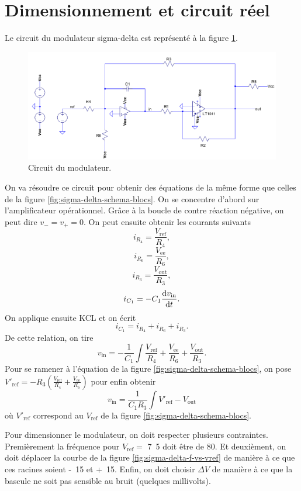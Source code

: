 \section{Dimensionnement et circuit réel}
Le circuit du modulateur sigma-delta est représenté
à la figure \ref{fig:sigma-delta-circuit}.

\begin{figure}[ht]
	\centering
	\includegraphics[scale=0.7]{img/sigma-delta-circuit.png}
	\caption{Circuit du modulateur.}
	\label{fig:sigma-delta-circuit}
\end{figure}

On va résoudre ce circuit pour obtenir des équations
de la même forme que celles de la figure
\ref{fig:sigma-delta-schema-blocs}.
On se concentre d'abord sur l'amplificateur
opérationnel. Grâce à la boucle de contre
réaction négative, on peut dire $v_- = v_+ = 0$.
On peut ensuite obtenir les courants suivants
\[ i_{R_4} = \frac{V_{\text{ref}}}{R_4},\]
\[ i_{R_6} = \frac{V_{\text{ee}}}{R_6},\]
\[ i_{R_3} = \frac{V_{\text{out}}}{R_3},\]
\[ i_{C_1} = -C_1\frac{\operatorname{d}\! v_{\text{in}}}{\operatorname{d}\! t}.\]
On applique ensuite KCL et on écrit
\[ i_{C_1} = i_{R_4} + i_{R_6} + i_{R_3}.\]
De cette relation, on tire
\[ v_{\text{in}} = -\frac{1}{C_1}\int \frac{V_{\text{ref}}}{R_4}
+ \frac{V_{\text{ee}}}{R_6} + \frac{V_{\text{out}}}{R_3}.\]
Pour se ramener à l'équation de la figure
\ref{fig:sigma-delta-schema-blocs}, on pose
$V'_{\text{ref}} = -R_3(\frac{V_{\text{ref}}}{R_4}+\frac{V_{\text{ee}}}{R_6})$
pour enfin obtenir
\[ v_{\text{in}} = \frac{1}{C_1R_3} \int V'_{\text{ref}} - V_{\text{out}}\]
où $V'_{\text{ref}}$ correspond au $V_{\text{ref}}$
de la figure \ref{fig:sigma-delta-schema-blocs}.

Pour dimensionner le modulateur, on doit respecter plusieurs
contraintes. Premièrement la fréquence pour $V_{\text{ref}} =$
\unit{7.5}{\volt} doit être de \unit{80}{\kilo\hertz}. Et deuxièment,
on doit déplacer la courbe de la figure \ref{fig:sigma-delta-f-vs-vref}
de manière à ce que ces racines soient \unit{-15}{\volt} et
\unit{+15}{\volt}. Enfin, on doit choisir $\Delta V$ de manière
à ce que la bascule ne soit pas sensible au bruit (quelques millivolts).

